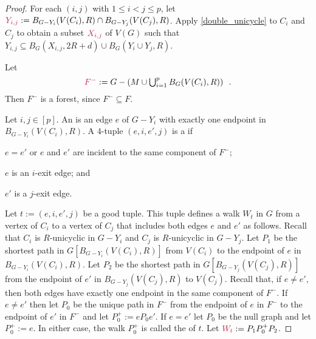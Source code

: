 \documentclass{patmorin}
\newcommand{\pat}[1]{\textcolor{Blue}{Pat: #1}}
\begin{document}
\begin{proof}
For each $(i,j)$ with $1\le i < j \le p$, let $\mathdefin{Y_{i,j}}:=B_{G-Y_i}(V(C_i),R)\cap B_{G-Y_j}(V(C_j),R)$.  Apply \cref{double_unicycle} to $C_i$ and $C_j$ to obtain a subset $\mathdefin{X_{i,j}}$ of $V(G)$ such that $Y_{i,j}\subseteq B_G(X_{i,j},2R+d) \cup B_G(Y_i\cup Y_j,R)$.

Let 
\[
  \textstyle\mathdefin{F^-}:=G-\left(M\cup \bigcup_{i=1}^p B_G(V(C_i),R)\right) \enspace .
\]
Then $F^-$ is a forest, since $F^-\subseteq F$.

Let $i,j\in[p]$. An  is an edge $e$ of $G-Y_i$ with exactly one endpoint in $B_{G-Y_i}(V(C_i),R)$.  
A $4$-tuple $(e,i,e',j)$ is a  if
\begin{compactitem}
  \item $e=e'$ or $e$ and $e'$ are incident to the same component of $F^-$;
  \item $e$ is an $i$-exit edge;
  and \item $e'$ is a $j$-exit edge. 
\end{compactitem}


Let $t:=(e,i,e',j)$ be a good tuple. 
This tuple defines a walk $W_t$ in $G$ from a vertex of $C_i$ to a vertex of $C_j$ that includes both edges $e$ and $e'$ as follows. %
Recall that $C_i$ is $R$-unicyclic in $G-Y_i$ and
$C_j$ is $R$-unicyclic in $G-Y_j$.
Let $P_1$ be the shortest path in $G[B_{G-Y_i}(V(C_i),R)]$ from $V(C_i)$ to the endpoint of $e$ in $B_{G-Y_i}(V(C_i),R)$. 
Let $P_2$ be the shortest path in $G[B_{G-Y_j}(V(C_j),R)]$ from the endpoint of $e'$ in $B_{G-Y_j}(V(C_j),R)$ to $V(C_j)$. 
Recall that, if $e\neq e'$, then both edges have exactly one endpoint in the same component of $F^-$.
If $e\neq e'$ then let $P_0$ be the unique path in $F^-$ 
from the endpoint of $e$ in $F^-$ to the endpoint of $e'$ in $F^-$ and let $P_0^+:=eP_0e'$. 
If $e=e'$ let $P_0$ be the null graph and let $P^+_0:=e$.  In either case, the walk $P_0^+$ is called the  of $t$. 
Let %
$\mathdefin{W_t}:= P_1P^+_0P_2$.


\end{proof}
\end{document}
